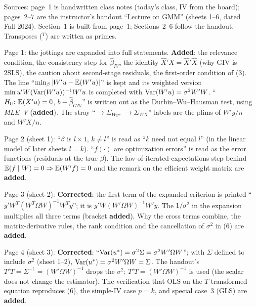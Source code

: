 \documentclass[11pt]{article}
\begin{document}
\begin{transcriptnotes}
 \item Sources: page~1 is handwritten class notes (today's class, IV from the board); pages~2--7 are the
       instructor's handout ``Lecture on GMM'' (sheets 1--6, dated Fall 2024). Section~1 is built from page~1;
       Sections~2--6 follow the handout. Transposes ($^{T}$) are written as primes.
 \item Page 1: the jottings are expanded into full statements. \textbf{Added}: the relevance condition, the
       consistency step for $\hat\beta_{IV}$, the identity $\hat X'X=\hat X'\hat X$ (why GIV is 2SLS), the caution about
       second-stage residuals, the first-order condition of (3). The line ``$\min_\beta|W'u-\mathbb{E}(W'u)|$'' is kept and
       its weighted version $\min u'W(\operatorname{Var}(W'u))^{-1}W'u$ is completed with $\operatorname{Var}(W'u)=\sigma^{2}W'W$.
       ``$H_{0}\colon\mathbb{E}(X'u)=0$, $b-\hat\beta_{GIV}$'' is written out as the Durbin--Wu--Hausman test, using
       \emph{MLE~V} (\textbf{added}). The stray ``$\to\Sigma_{Wy}$, $\to\Sigma_{WX}$'' labels are the plims of $W'y/n$ and $W'X/n$.
 \item Page 2 (sheet 1): ``$\beta$ is $l\times1$, $k\neq l$'' is read as ``$k$ need not equal $l$'' (in the linear model
       of later sheets $l=k$). ``$f(\cdot)$ are optimization errors'' is read as the error functions
       (residuals at the true $\beta$). The law-of-iterated-expectations step behind $\mathbb{E}(f\mid W)=0\Rightarrow\mathbb{E}(W'f)=0$
       and the remark on the efficient weight matrix are \textbf{added}.
 \item Page 3 (sheet 2): \textbf{Corrected}: the first term of the expanded criterion is printed
       ``$y'W^{T}(W^{T}\Omega W)^{-1}W^{T}y$''; it is
       $y'W(W'\Omega W)^{-1}W'y$. The $1/\sigma^{2}$ in the expansion multiplies all three terms (bracket
       \textbf{added}). Why the cross terms combine, the matrix-derivative rules, the rank condition and the
       cancellation of $\sigma^{2}$ in (6) are \textbf{added}.
 \item Page 4 (sheet 3): \textbf{Corrected}: ``$\operatorname{Var}(u^{*})=\sigma^{2}\Sigma=\sigma^{2}W'\Omega W$''; with $\Sigma$ defined to include $\sigma^{2}$
       (sheet 1--2), $\operatorname{Var}(u^{*})=\sigma^{2}W'\Omega W=\Sigma$. The handout's $T'T=\Sigma^{-1}=(W'\Omega W)^{-1}$ drops the
       $\sigma^{2}$; $T'T=(W'\Omega W)^{-1}$ is used (the scalar does not change the estimator). The verification that OLS
       on the $T$-transformed equation reproduces (6), the simple-IV case $p=k$, and special case~3 (GLS)
       are \textbf{added}.

\end{transcriptnotes}
\end{document}
